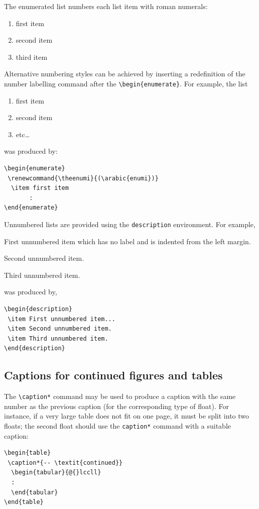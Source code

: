 \documentclass{gji}
\begin{document}
The enumerated list numbers each list item with roman numerals:
\begin{enumerate}
  \item first item
  \item second item
  \item third item
\end{enumerate}
Alternative numbering styles can be achieved by inserting a
redefinition of the number labelling command after the
\verb"\begin{enumerate}". For example, the list
\begin{enumerate}
\renewcommand{\theenumi}{(\arabic{enumi})}
  \item first item
  \item second item
  \item etc\ldots
\end{enumerate}
was produced by:
\begin{verbatim}
\begin{enumerate}
 \renewcommand{\theenumi}{(\arabic{enumi})}
  \item first item
       :
\end{enumerate}
\end{verbatim}
Unnumbered lists are provided using the \verb"description" environment.
For example,
\begin{description}
  \item First unnumbered item which has no label and is indented from
        the left margin.
  \item Second unnumbered item.
  \item Third unnumbered item.
\end{description}
was produced by,
\begin{verbatim}
\begin{description}
 \item First unnumbered item...
 \item Second unnumbered item.
 \item Third unnumbered item.
\end{description}
\end{verbatim}

\subsection{Captions for continued figures and tables}

The \verb"\caption*" command may be used to produce a caption with the
same number as the previous caption (for the corresponding type of
float). For instance, if a very large table does not fit on one page,
it must be split into two floats; the second float should use the
\verb"caption*" command with a suitable caption:
\begin{verbatim}
\begin{table}
 \caption*{-- \textit{continued}}
  \begin{tabular}{@{}lccll}
  :
  \end{tabular}
\end{table}
\end{verbatim}
\end{document}
